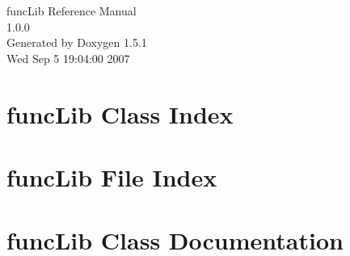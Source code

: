 \documentclass[a4paper]{book}
\begin{document}
\begin{titlepage}
\vspace*{7cm}
\begin{center}
{\Large func\-Lib Reference Manual\\[1ex]\large 1.0.0 }\\
\vspace*{1cm}
{\large Generated by Doxygen 1.5.1}\\
\vspace*{0.5cm}
{\small Wed Sep 5 19:04:00 2007}\\
\end{center}
\end{titlepage}
\clearemptydoublepage
{}
\tableofcontents
\clearemptydoublepage
{}
\chapter{func\-Lib Class Index}

\chapter{func\-Lib File Index}

\chapter{func\-Lib Class Documentation}













































\end{document}
